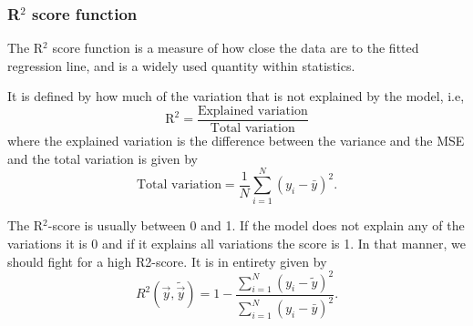 \subsubsection{R$^2$ score function} \label{sec:R2}
The R$^2$ score function is a measure of how close the data are to the fitted regression line, and is a widely used quantity within statistics. \cite{R2}

It is defined by how much of the variation that is not explained by the model, i.e, 
\begin{equation*}
\text{R}^2=\frac{\text{Explained variation}}{\text{Total variation}}
\end{equation*}
where the explained variation is the difference between the variance and the MSE and the total variation is given by
\begin{equation*}
\text{Total variation}=\frac{1}{N}\sum_{i=1}^N(y_i-\bar{y})^2.
\end{equation*}

The R$^2$-score is usually between 0 and 1. If the model does not explain any of the variations it is 0 and if it explains all variations the score is 1. In that manner, we should fight for a high R2-score. It is in entirety given by
\begin{equation}
R^2(\vec{y},\tilde{\vec{y}})=1-\frac{\sum_{i=1}^N(y_i-\tilde{y})^2}{\sum_{i=1}^N(y_i-\bar{y})^2}.
\end{equation}